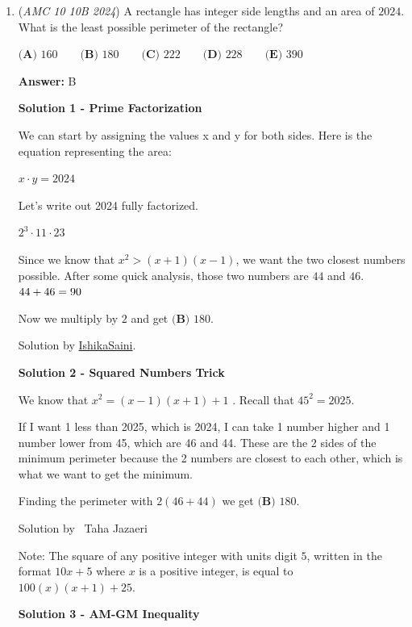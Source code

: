 \begin{enumerate}
 


	\item (\textit{AMC 10 10B 2024}) A rectangle has integer side lengths and an area of $2024$. What is the least possible perimeter of the rectangle?


 $\textbf{(A) } 160 \qquad\textbf{(B) } 180 \qquad\textbf{(C) } 222 \qquad\textbf{(D) } 228 \qquad\textbf{(E) } 390$

 \textbf{Answer: }B



\textbf{Solution 1 - Prime Factorization}

We can start by assigning the values x and y for both sides. Here is the equation representing the area:

 
$x \cdot y = 2024$

 Let's write out 2024 fully factorized.

 
$2^3 \cdot 11 \cdot 23$

 Since we know that $x^2 > (x+1)(x-1)$, we want the two closest numbers possible. After some quick analysis, those two numbers are $44$ and $46$. $\\44+46=90$

 Now we multiply by $2$ and get $\boxed{\textbf{(B) }180}.$

 Solution by \href{https://artofproblemsolving.com/wiki/index.php?title=User:IshikaSaini&action=edit&redlink=1}{IshikaSaini}.

 



\textbf{Solution 2 - Squared Numbers Trick}

We know that $x^2 = (x-1)(x+1)+1$ . Recall that $45^2 = 2025$. 

 If I want 1 less than 2025, which is 2024, I can take 1 number higher and 1 number lower from 45, which are 46 and 44. These are the 2 sides of the minimum perimeter because the 2 numbers are closest to each other, which is what we want to get the minimum. 

 Finding the perimeter with $2(46+44)$ we get $\boxed{\textbf{(B) }180}.$

 Solution by ~Taha Jazaeri

 Note: The square of any positive integer with units digit $5$, written in the format $10x + 5$ where $x$ is a positive integer, is equal to $100(x)(x+1)+25$. 

 



\textbf{Solution 3 - AM-GM Inequality}


\end{enumerate}
